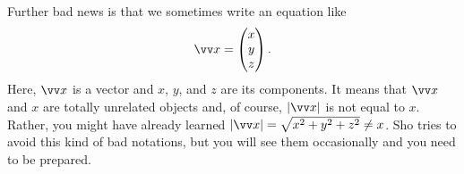 \documentclass[11pt,pdfa,lastpage]{MishoNote}
\begin{document}
Further bad news is that we sometimes write an equation like
\[\vc x=\pmat{x\\y\\z}.\]
Here, $\vc x$ is a vector and $x$, $y$, and $z$ are its components.
It means that $\vc x$ and $x$ are totally unrelated objects and, of course, $|\vc x|$ is not equal to $x$. Rather, you might have already learned $|\vc x|=\sqrt{x^2+y^2+z^2}\neq x$.
Sho tries to avoid this kind of bad notations, but you will see them occasionally and you need to be prepared.

\end{document}
